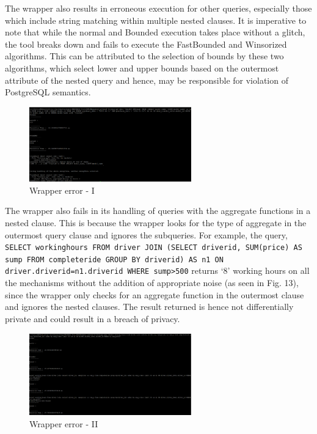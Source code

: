 \documentclass[acmsmall]{acmart}
\begin{document}
The wrapper also results in erroneous execution for other queries, especially those which include string matching within multiple nested clauses. It is imperative to note that while the normal and Bounded execution takes place without a glitch, the tool breaks down and fails to execute the FastBounded and Winsorized algorithms. This can be attributed to the selection of bounds by these two algorithms, which select lower and upper bounds based on the outermost attribute of the nested query and hence, may be responsible for violation of PostgreSQL semantics.
\begin{figure}[htp]
    \centering
    \includegraphics[width=7cm]{Fig 4.3.7.png}
    \caption{Wrapper error - I}
    \label{Fig:4.3.7}
\end{figure}

The wrapper also fails in its handling of queries with the aggregate functions in a nested clause. This is because the wrapper looks for the type of aggregate in the outermost query clause and ignores the subqueries. For example, the query, \texttt{SELECT working\textunderscore hours FROM driver JOIN (SELECT driver\textunderscore id, SUM(price) AS sum\textunderscore p FROM completeride GROUP BY driver\textunderscore id) AS n1 ON driver.driver\textunderscore id=n1.driver\textunderscore id WHERE sum\textunderscore p>500} returns ‘8’ working hours on all the mechanisms without the addition of appropriate noise (as seen in Fig. 13), since the wrapper only checks for an aggregate function in the outermost clause and ignores the nested clauses. The result returned is hence not differentially private and could result in a breach of privacy.
\begin{figure}[htp]
    \centering
    \includegraphics[width=7cm]{Fig 4.3.8.png}
    \caption{Wrapper error - II}
    \label{Fig:4.3.8}
\end{figure}
\end{document}
